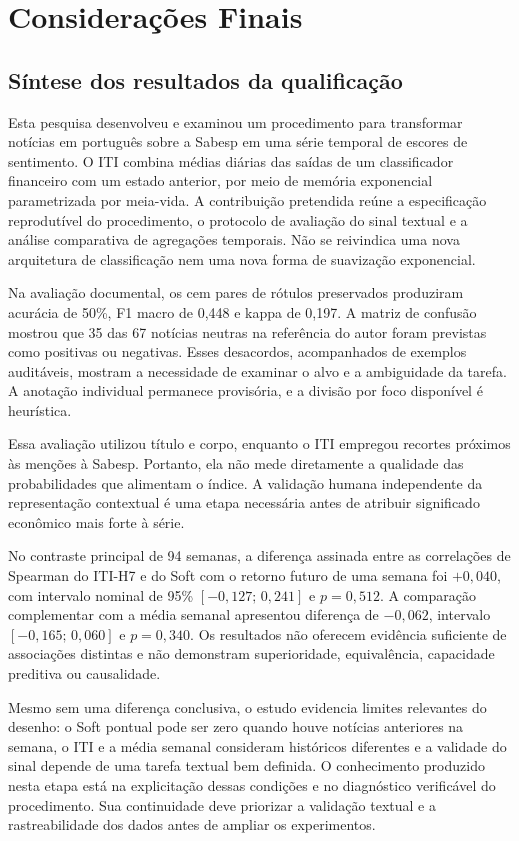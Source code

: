 \chapter{Considerações Finais}
\label{cap:consideracoes}

\section{Síntese dos resultados da qualificação}

Esta pesquisa desenvolveu e examinou um procedimento para transformar notícias em português sobre a Sabesp em uma série temporal de escores de sentimento. O ITI combina médias diárias das saídas de um classificador financeiro com um estado anterior, por meio de memória exponencial parametrizada por meia-vida. A contribuição pretendida reúne a especificação reprodutível do procedimento, o protocolo de avaliação do sinal textual e a análise comparativa de agregações temporais. Não se reivindica uma nova arquitetura de classificação nem uma nova forma de suavização exponencial.

Na avaliação documental, os cem pares de rótulos preservados produziram acurácia de 50\%, F1 macro de 0,448 e kappa de 0,197. A matriz de confusão mostrou que 35 das 67 notícias neutras na referência do autor foram previstas como positivas ou negativas. Esses desacordos, acompanhados de exemplos auditáveis, mostram a necessidade de examinar o alvo e a ambiguidade da tarefa. A anotação individual permanece provisória, e a divisão por foco disponível é heurística.

Essa avaliação utilizou título e corpo, enquanto o ITI empregou recortes próximos às menções à Sabesp. Portanto, ela não mede diretamente a qualidade das probabilidades que alimentam o índice. A validação humana independente da representação contextual é uma etapa necessária antes de atribuir significado econômico mais forte à série.

No contraste principal de 94 semanas, a diferença assinada entre as correlações de Spearman do ITI-H7 e do Soft com o retorno futuro de uma semana foi $+0{,}040$, com intervalo nominal de 95\% $[-0{,}127;\,0{,}241]$ e $p=0{,}512$. A comparação complementar com a média semanal apresentou diferença de $-0{,}062$, intervalo $[-0{,}165;\,0{,}060]$ e $p=0{,}340$. Os resultados não oferecem evidência suficiente de associações distintas e não demonstram superioridade, equivalência, capacidade preditiva ou causalidade.

Mesmo sem uma diferença conclusiva, o estudo evidencia limites relevantes do desenho: o Soft pontual pode ser zero quando houve notícias anteriores na semana, o ITI e a média semanal consideram históricos diferentes e a validade do sinal depende de uma tarefa textual bem definida. O conhecimento produzido nesta etapa está na explicitação dessas condições e no diagnóstico verificável do procedimento. Sua continuidade deve priorizar a validação textual e a rastreabilidade dos dados antes de ampliar os experimentos.

